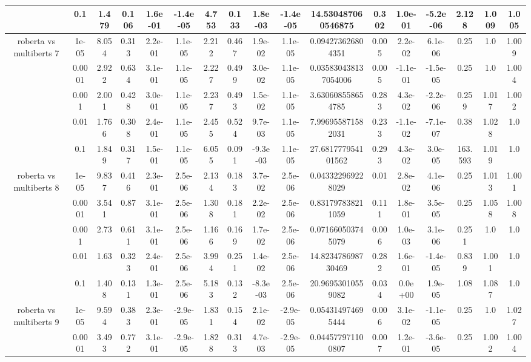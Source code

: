 \begin{tabular}{|c|c|c|c|c|c|c|c|c|c|c|c|c|c|c|c|c|}
 & 0.1 & 1.479 & 0.106 & 1.6e-01 & -1.4e-05 & 4.753 & 0.133 & 1.8e-03 & -1.4e-05 & 14.530487060546875 & 0.302 & 1.0e-01 & -5.2e-06 & 2.128 & 1.009 & 1.005 \\
\hline
\multirow{5}{*}{roberta  vs multiberts 7} & 1e-05 & 8.054 & 0.313 & 2.2e-01 & 1.1e-05 & 2.212 & 0.467 & 1.9e-02 & 1.1e-05 & 0.094273626804351 & 0.005 & 2.2e-02 & 6.1e-06 & 0.25 & 1.0 & 1.009 \\
 & 0.0001 & 2.922 & 0.634 & 3.1e-01 & 1.1e-05 & 2.227 & 0.499 & 3.0e-02 & 1.1e-05 & 0.035830438137054006 & 0.005 & -1.1e-01 & -1.5e-05 & 0.25 & 1.0 & 1.004 \\
 & 0.001 & 2.001 & 0.428 & 3.0e-01 & 1.1e-05 & 2.237 & 0.493 & 1.5e-02 & 1.1e-05 & 3.630608558654785 & 0.283 & 4.3e-02 & -2.2e-06 & 0.259 & 1.017 & 1.002 \\
 & 0.01 & 1.766 & 0.308 & 2.4e-01 & 1.1e-05 & 2.455 & 0.524 & 9.7e-03 & 1.1e-05 & 7.996955871582031 & 0.233 & -1.1e-02 & -7.1e-07 & 0.38 & 1.028 & 1.0 \\
 & 0.1 & 1.849 & 0.317 & 1.5e-01 & 1.1e-05 & 6.055 & 0.091 & -9.3e-03 & 1.1e-05 & 27.681777954101562 & 0.293 & 4.3e-02 & 3.0e-05 & 163.593 & 1.019 & 1.0 \\
\hline
\multirow{5}{*}{roberta  vs multiberts 8} & 1e-05 & 9.837 & 0.416 & 2.3e-01 & 2.5e-06 & 2.134 & 0.183 & 3.7e-02 & 2.5e-06 & 0.043322969228029 & 0.01 & 2.8e-02 & 4.1e-06 & 0.25 & 1.013 & 1.001 \\
 & 0.0001 & 3.541 & 0.87 & 3.1e-01 & 2.5e-06 & 1.308 & 0.181 & 2.2e-02 & 2.5e-06 & 0.831797838211059 & 0.111 & 1.8e-01 & 3.5e-05 & 0.25 & 1.058 & 1.008 \\
 & 0.001 & 2.73 & 0.611 & 3.1e-01 & 2.5e-06 & 1.166 & 0.169 & 1.7e-02 & 2.5e-06 & 0.071660503745079 & 0.006 & 1.0e-03 & 3.1e-06 & 0.251 & 1.0 & 1.0 \\
 & 0.01 & 1.63 & 0.323 & 2.4e-01 & 2.5e-06 & 3.994 & 0.251 & 1.4e-02 & 2.5e-06 & 14.823478698730469 & 0.282 & 1.6e-01 & -1.4e-05 & 0.839 & 1.001 & 1.0 \\
 & 0.1 & 1.408 & 0.131 & 1.3e-01 & 2.5e-06 & 5.183 & 0.132 & -8.3e-03 & 2.5e-06 & 20.96953010559082 & 0.034 & 0.0e+00 & 1.9e-05 & 1.08 & 1.087 & 1.0 \\
\hline
\multirow{5}{*}{roberta  vs multiberts 9} & 1e-05 & 9.594 & 0.383 & 2.3e-01 & -2.9e-05 & 1.831 & 0.154 & 2.1e-02 & -2.9e-05 & 0.054314974695444 & 0.006 & 3.1e-02 & -1.1e-05 & 0.25 & 1.0 & 1.027 \\
 & 0.0001 & 3.493 & 0.772 & 3.1e-01 & -2.9e-05 & 1.828 & 0.313 & 4.7e-03 & -2.9e-05 & 0.044577971100807 & 0.007 & 1.2e-01 & -3.6e-05 & 0.25 & 1.002 & 1.004 \\

\end{tabular}
